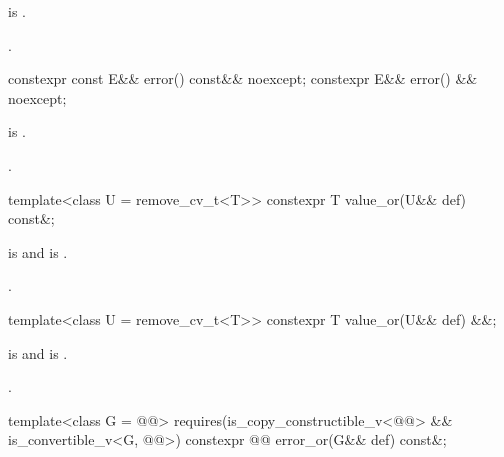 \begin{itemdescr}
\pnum
\hardexpects
{} is .

\pnum
\returns
{}.
\end{itemdescr}

%
\begin{itemdecl}
constexpr const E&& error() const&& noexcept;
constexpr E&& error() && noexcept;
\end{itemdecl}

\begin{itemdescr}
\pnum
\hardexpects
{} is .

\pnum
\returns
{}.
\end{itemdescr}

%
\begin{itemdecl}
template<class U = remove_cv_t<T>> constexpr T value_or(U&& def) const&;
\end{itemdecl}

\begin{itemdescr}
\pnum
\mandates
{} is  and  is .

\pnum
\returns
{}.
\end{itemdescr}

%
\begin{itemdecl}
template<class U = remove_cv_t<T>> constexpr T value_or(U&& def) &&;
\end{itemdecl}

\begin{itemdescr}
\pnum
\mandates
{} is  and  is .

\pnum
\returns
{}.
\end{itemdescr}

%
\begin{itemdecl}
template<class G = @@>
  requires(is_copy_constructible_v<@@> &&
           is_convertible_v<G, @@>)
constexpr @@ error_or(G&& def) const&;
\end{itemdecl}

